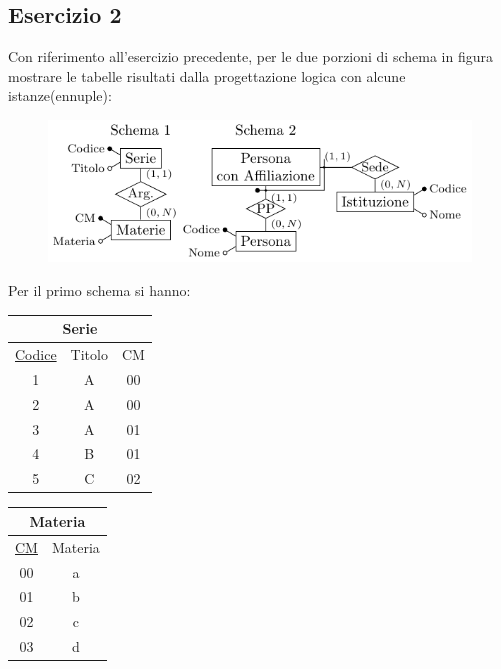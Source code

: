 \documentclass{article}
\numberwithin{equation}{subsection}
\begin{document}
\subsection{Esercizio 2}

Con riferimento all'esercizio precedente, per le due porzioni di schema in figura mostrare le tabelle risultati dalla progettazione logica con 
alcune istanze(ennuple):
\begin{figure}[H]%
    \centering%
    \includegraphics[scale=1.25]{esercizio_2_29-11-24.pdf}%
\end{figure}

Per il primo schema si hanno:
\begin{center}
    \begin{tabular}{|c|c|c|}
        \hline\multicolumn{3}{|c|}{Serie}\\
        \hline
        \underline{Codice} & Titolo & CM \\
        \hline
        1 & A & 00\\
        \hline
        2 & A & 00\\
        \hline
        3 & A & 01\\
        \hline
        4 & B & 01\\
        \hline
        5 & C & 02\\
        \hline
    \end{tabular}
    \begin{tabular}{|c|c|}
        \hline\multicolumn{2}{|c|}{Materia}\\
        \hline
        \underline{CM} & Materia\\
        \hline
        00 & a\\
        \hline
        01 & b\\
        \hline
        02 & c\\
        \hline
        03 & d\\
        \hline
    \end{tabular}
\end{center}
\end{document}
